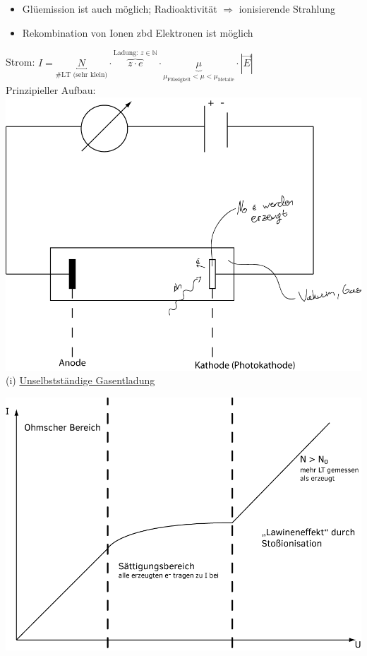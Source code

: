 \documentclass[11pt]{article}
\begin{document}
	\begin{itemize}
		\item Glüemission ist auch möglich; Radioaktivität $  \Rightarrow $ ionisierende Strahlung
		\item Rekombination von Ionen zbd Elektronen ist möglich
	\end{itemize}
	Strom: $ \boxed{I = \underbracket{N}_{\text{\#LT (sehr klein)}} \cdot \overbrace{z \cdot e}^{\text{Ladung: }z \in \mathbb{N} } \cdot \underbrace{\mu}_{ \mu_{\text{Flüssigkeit}} <\mu<\mu_{\text{Metalle}} } \cdot |\vec{E}| } $ \\
	\newpage
	Prinzipieller Aufbau: \\
		\includegraphics[width=0.8\linewidth]{skizzen/15/VL07/VL7_3}
	\\
	(i) \underline{Unselbstständige Gasentladung} \\
	\begin{center}
		\includegraphics[width=0.8\linewidth]{skizzen/15/VL07/VL7_2}
	\end{center}
\end{document}
